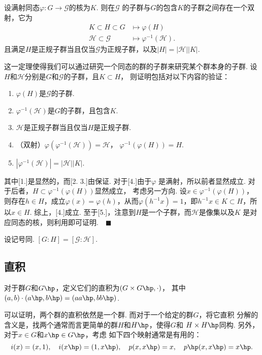   \begin{thm}
    \label{thm: 对应定理}
    设满射同态$\varphi:G\to\mathcal{G}$的核为$K$. 则在$\mathcal{G}$
    的子群与$G$的包含$K$的子群之间存在一个双射，它为
    \[\begin{split}
      K\subset H\subset G &\mapsto \varphi(H) \\
      \mathcal{H} \subset \mathcal{G} &\mapsto \varphi^{-1}(\mathcal{H}).
    \end{split}\]
    且满足$H$是正规子群当且仅当$\mathcal{G}$为正规子群，以及$|H|=|\mathcal{H}||K|$.
  \end{thm}
  \remark
    这一定理使得我们可以通过研究一个同态的群的子群来研究某个群本身的子群.
  \proof
    设$H$和$\mathcal{H}$分别是$G$和$\mathcal{G}$的子群，且$K\subset H$，
    则证明包括对以下内容的验证：
    \begin{enumerate}
      \item $\varphi(H)$是$\mathcal{G}$的子群.
      \item $\varphi^{-1}(\mathcal{H})$是$G$的子群，且包含$K$.
      \item $\mathcal{H}$是正规子群当且仅当$H$是正规子群.
      \item （双射）$\varphi(\varphi^{-1}(\mathcal{H}))=\mathcal{H}$，
        $\varphi^{-1}(\varphi(H))=H$.
      \item $|\varphi^{-1}(\mathcal{H})|=|\mathcal{H}||K|$.
    \end{enumerate}
    其中[1.]是显然的，而[2. 3.]由保证. 对于[4.]由于$\varphi$
    是满射，所以前者显然成立. 对于后者，$H\subset\varphi^{-1}(\varphi(H))$显然成立，
    考虑另一方向. 设$x\in\varphi^{-1}(\varphi(H))$，则存在$h\in H$，成立$\varphi(x)
    =\varphi(h)$，从而$\varphi(h^{-1}x)=1$，即$h^{-1}x\in K\subset H$，所以$x\in
    H$. 综上，[4.]成立. 至于[5.]，注意到$H$是一个子群，而$\mathcal{H}$是像集以及$K$
    是对应同态的核，则利用即可证明.$\quad\blacksquare$

  \begin{pos}
    设记号同. $[G:H] = [\mathcal{G}:\mathcal{H}]$.
  \end{pos}

\subsection{直积}

  \begin{defi}[直积]
    对于群$G$和$G\hp$，定义它们的直积为$(G\times G\hp, \cdot)$，
    其中$(a, b)\cdot (a\hp, b\hp) = (aa\hp, bb\hp)$.
  \end{defi}
  \remark
    可以证明，两个群的直积依然是一个群. 而对于一个给定的群$G$，将它直积
    分解的含义是，找两个通常而言更简单的群$H$和$H\hp$，使得$G$和
    $H\times H\hp$同构. 另外，对于$x\in G$和$x\hp\in G\hp$，考虑
    如下四个映射通常是有用的：
    \[
      i(x)=(x, 1),\quad i(x\hp) = (1, x\hp),\quad
      p(x,x\hp) = x, \quad p\hp(x,x\hp)=x\hp.
    \]

